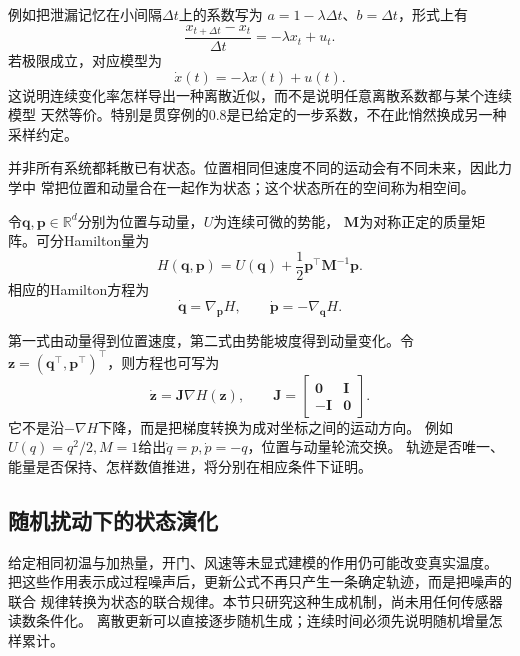 例如把泄漏记忆在小间隔$\Delta t$上的系数写为
$a=1-\lambda\Delta t$、$b=\Delta t$，形式上有
\[
  \frac{x_{t+\Delta t}-x_t}{\Delta t}=-\lambda x_t+u_t.
\]
若极限成立，对应模型为
\begin{equation}
  \dot x(t)=-\lambda x(t)+u(t).
  \label{eq:dynamical-leaky-continuous-memory}
\end{equation}
这说明连续变化率怎样导出一种离散近似，而不是说明任意离散系数都与某个连续模型
天然等价。特别是贯穿例的$0.8$是已给定的一步系数，不在此悄然换成另一种采样约定。

并非所有系统都耗散已有状态。位置相同但速度不同的运动会有不同未来，因此力学中
常把位置和动量合在一起作为状态；这个状态所在的空间称为相空间。
\begin{definition}[可分Hamilton系统]
  \label{def:dynamical-separable-hamiltonian-system}
  令$\bm q,\bm p\in\mathbb R^d$分别为位置与动量，$U$为连续可微的势能，
  $\bm M$为对称正定的质量矩阵。可分Hamilton量为
  \begin{equation}
    H(\bm q,\bm p)=U(\bm q)+\frac12\bm p^\top\bm M^{-1}\bm p.
    \label{eq:dynamical-separable-hamiltonian}
  \end{equation}
  相应的Hamilton方程为
  \begin{equation}
    \dot{\bm q}=\nabla_{\bm p}H,\qquad
    \dot{\bm p}=-\nabla_{\bm q}H.
    \label{eq:dynamical-hamilton-equations}
  \end{equation}
\end{definition}
第一式由动量得到位置速度，第二式由势能坡度得到动量变化。令
$\bm z=(\bm q^\top,\bm p^\top)^\top$，则方程也可写为
\[
  \dot{\bm z}=\bm J\nabla H(\bm z),\qquad
  \bm J=\begin{bmatrix}\bm0&\bm I\\-\bm I&\bm0\end{bmatrix}.
\]
它不是沿$-\nabla H$下降，而是把梯度转换为成对坐标之间的运动方向。
例如$U(q)=q^2/2,M=1$给出$\dot q=p,\dot p=-q$，位置与动量轮流交换。
轨迹是否唯一、能量是否保持、怎样数值推进，将分别在相应条件下证明。

\subsection{随机扰动下的状态演化}
\label{sec:dynamical-ito-fokker-planck}

给定相同初温与加热量，开门、风速等未显式建模的作用仍可能改变真实温度。
把这些作用表示成过程噪声后，更新公式不再只产生一条确定轨迹，而是把噪声的联合
规律转换为状态的联合规律。本节只研究这种生成机制，尚未用任何传感器读数条件化。
离散更新可以直接逐步随机生成；连续时间必须先说明随机增量怎样累计。


